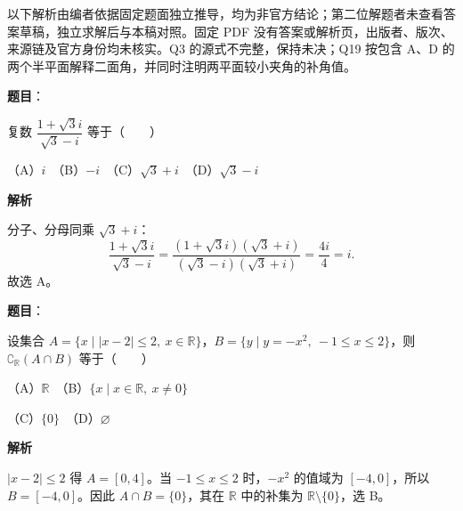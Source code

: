 

\begin{gktip}
以下解析由编者依据固定题面独立推导，均为非官方结论；第二位解题者未查看答案草稿，独立求解后与本稿对照。固定 PDF 没有答案或解析页，出版者、版次、来源链及官方身份均未核实。Q3 的源式不完整，保持未决；Q19 按包含 A、D 的两个半平面解释二面角，并同时注明两平面较小夹角的补角值。
\end{gktip}

\begin{answer}

\textbf{题目}：

复数 $\dfrac{1+\sqrt{3}i}{\sqrt{3}-i}$ 等于\mbox{（　　）}

（A）$i$　（B）$-i$　（C）$\sqrt{3}+i$　（D）$\sqrt{3}-i$

\textbf{解析}

分子、分母同乘 $\sqrt3+i$：
\nopagebreak[4]
\[
\frac{1+\sqrt3i}{\sqrt3-i}
=\frac{(1+\sqrt3i)(\sqrt3+i)}{(\sqrt3-i)(\sqrt3+i)}
=\frac{4i}{4}=i.
\]
故选 A。


\end{answer}
\begin{answer}

\textbf{题目}：

设集合 $A=\{x\mid |x-2|\leqslant 2,\ x\in\mathbb R\}$，$B=\{y\mid y=-x^2,\ -1\leqslant x\leqslant 2\}$，则 $\complement_{\mathbb R}(A\cap B)$ 等于\mbox{（　　）}

（A）$\mathbb R$　（B）$\{x\mid x\in\mathbb R,\ x\ne0\}$

（C）$\{0\}$　（D）$\varnothing$

\textbf{解析}

$|x-2|\le2$ 得 $A=[0,4]$。当 $-1\le x\le2$ 时，$-x^2$ 的值域为 $[-4,0]$，所以 $B=[-4,0]$。因此 $A\cap B=\{0\}$，其在 $\mathbb R$ 中的补集为 $\mathbb R\setminus\{0\}$，选 B。


\end{answer}
